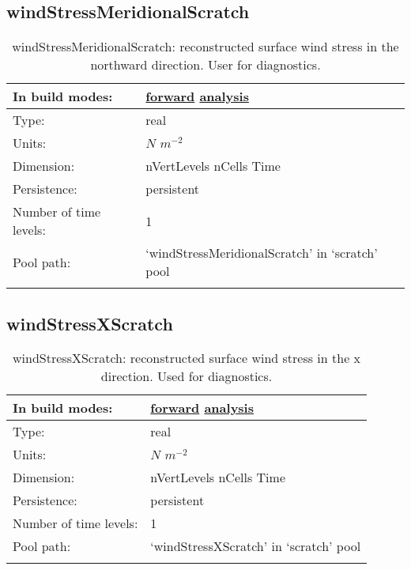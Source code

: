 \subsection[windStressMeridionalScratch]{windStressMeridionalScratch}
\label{subsec:var_sec_scratch_windStressMeridionalScratch}
\begin{center}
\begin{longtable}{| p{2.0in} | p{4.0in} |}
        \hline 
        In build modes: & \hyperref[subsec:forward_var_tab_scratch]{forward} \hyperref[subsec:analysis_var_tab_scratch]{analysis} \\
        \hline 
        Type: & real \\
        \hline 
        Units: & $N$ $m^{-2}$ \\
        \hline 
        Dimension: & nVertLevels nCells Time \\
        \hline 
        Persistence: & persistent \\
        \hline 
        Number of time levels: & 1 \\
        \hline 
            Pool path: & `windStressMeridionalScratch' in `scratch' pool \\
		 \hline 
    \caption{windStressMeridionalScratch: reconstructed surface wind stress in the northward direction. User for diagnostics.}
\end{longtable}
\end{center}
\subsection[windStressXScratch]{windStressXScratch}
\label{subsec:var_sec_scratch_windStressXScratch}
\begin{center}
\begin{longtable}{| p{2.0in} | p{4.0in} |}
        \hline 
        In build modes: & \hyperref[subsec:forward_var_tab_scratch]{forward} \hyperref[subsec:analysis_var_tab_scratch]{analysis} \\
        \hline 
        Type: & real \\
        \hline 
        Units: & $N$ $m^{-2}$ \\
        \hline 
        Dimension: & nVertLevels nCells Time \\
        \hline 
        Persistence: & persistent \\
        \hline 
        Number of time levels: & 1 \\
        \hline 
            Pool path: & `windStressXScratch' in `scratch' pool \\
		 \hline 
    \caption{windStressXScratch: reconstructed surface wind stress in the x direction. Used for diagnostics.}
\end{longtable}
\end{center}
